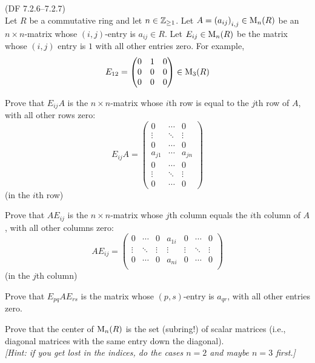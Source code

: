 \begin{problem}{(\textsf{DF 7.2.6--7.2.7})} \\
  Let $R$ be a commutative ring and let $n \in \mathbb{Z}_{\geq 1}$.
  Let $A={(a_{ij})}_{i,j} \in \operatorname{M}_n(R)$ be an $n \times n$-matrix
  whose $(i,j)$-entry is $a_{ij} \in R$.
  Let $E_{ij} \in \operatorname{M}_n(R)$ be the matrix whose $(i,j)$ entry is $1$ with all other entries zero.
  For example,
  \[E_{12}=\begin{pmatrix} 0 & 1 & 0 \\ 0 & 0 & 0 \\ 0 & 0 & 0\end{pmatrix} \in \operatorname{M}_3(R)\]  
  \begin{enumalph}
    \item Prove that $E_{ij}A$ is the $n \times n$-matrix whose $i$th row
      is equal to the $j$th row of $A$, with all other rows zero:
      \[
        E_{ij}A=\begin{pmatrix}
        0 & \cdots & 0 \\
        \vdots & \ddots & \vdots \\
        0 & \cdots & 0 \\
        a_{j1} & \cdots & a_{jn} \\
        0 & \cdots & 0 \\
        \vdots & \ddots & \vdots \\
        0 & \cdots & 0
        \end{pmatrix}
      \] (in the $i$th row)
    \item Prove that $AE_{ij}$ is the $n \times n$-matrix whose $j$th column
      equals the $i$th column of $A$, with all other columns zero:
      \[
        AE_{ij}=\begin{pmatrix}
        0 & \cdots & 0 & a_{1i} & 0 & \cdots & 0 \\
        \vdots & \ddots & \vdots & \vdots & \vdots & \ddots & \vdots \\
        0 & \cdots & 0 & a_{ni} & 0 & \cdots & 0 \\
        \end{pmatrix}
      \]
      (in the $j$th column)
    \item Prove that $E_{pq}AE_{rs}$ is the matrix whose $(p,s)$-entry
      is $a_{qr}$, with all other entries zero.
    \item Prove that the center of $\operatorname{M}_n(R)$ is the set (subring!) of scalar matrices 
      (i.e., diagonal matrices with the same entry down the diagonal). \\
      \emph{[Hint: if you get lost in the indices, do the cases $n=2$ and maybe $n=3$ first.]}
  \end{enumalph}
\end{problem}

